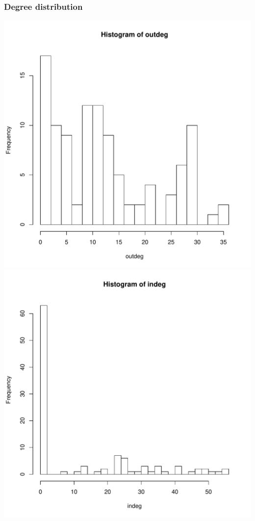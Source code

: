 \documentclass[compress,10pt]{beamer}
\begin{document}
\begin{frame}
 \frametitle{Degree distribution}
 
 \begin{center}
\includegraphics[scale=.3]{plots/chilean_outdeg.pdf}  
\includegraphics[scale=.3]{plots/chilean_intdeg.pdf}
\end{center}

\end{frame}
\end{document}
